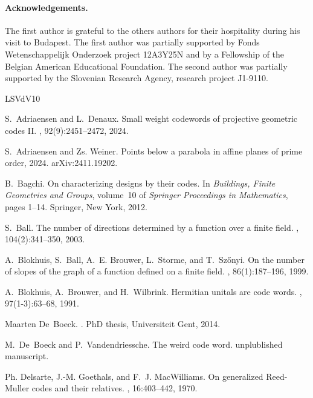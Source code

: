 \documentclass[12pt, a4paper]{article}
\theoremstyle{definition}
\begin{document}
\paragraph{Acknowledgements.} The first author is grateful to the others authors for their hospitality during his visit to Budapest.
The first author was partially supported by Fonds Wetenschappelijk Onderzoek project 12A3Y25N and by a Fellowship of the Belgian American Educational Foundation. The second author was partially supported by the Slovenian Research Agency,
research project J1-9110.

\newcommand{\etalchar}[1]{$^{#1}$}
\begin{thebibliography}{LSVdV10}

S.~Adriaensen and L.~Denaux.
\newblock Small weight codewords of projective geometric codes {II}.
, 92(9):2451--2472, 2024.

S.~Adriaensen and Zs. Weiner.
\newblock Points below a parabola in affine planes of prime order, 2024.
\newblock arXiv:2411.19202.

B.~Bagchi.
\newblock On characterizing designs by their codes.
\newblock In {\em Buildings, Finite Geometries and Groups}, volume~10 of {\em Springer Proceedings in Mathematics}, pages 1--14. Springer, New York, 2012.

S.~Ball.
\newblock The number of directions determined by a function over a finite field.
, 104(2):341--350, 2003.

\bibitem[BBB{\etalchar{+}}99]{BBBSS}
A.~Blokhuis, S.~Ball, A.~E. Brouwer, L.~Storme, and T.~Sz{\H o}nyi.
\newblock On the number of slopes of the graph of a function defined on a finite field.
, 86(1):187--196, 1999.

A.~Blokhuis, A.~Brouwer, and H.~Wilbrink.
\newblock Hermitian unitals are code words.
, 97(1-3):63--68, 1991.

Maarten De~Boeck.
.
\newblock Ph{D} thesis, Universiteit Gent, 2014.

M.~De~Boeck and P.~Vandendriessche.
\newblock The weird code word.
\newblock unplublished manuscript.

Ph. Delsarte, J.-M. Goethals, and F.~J. MacWilliams.
\newblock On generalized {R}eed-{M}uller codes and their relatives.
, 16:403--442, 1970.


\end{thebibliography}
\end{document}

